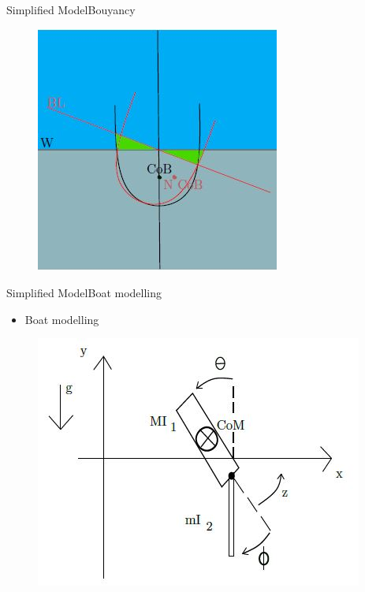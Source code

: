 \documentclass{beamer}
\begin{document}
\begin{frame}{Simplified Model}{Bouyancy \vphantom{(y}}
\vspace{-0.7em}
\begin{figure}
  \includegraphics[scale=0.7]{images/boat_b.JPG}
\end{figure}

\end{frame}

\begin{frame}{Simplified Model}{Boat modelling \vphantom{(y}}
\vspace{-0.7em}
\begin{itemize}
  \item {\color{blue}Boat modelling}
\end{itemize}
\begin{figure}
  \includegraphics[scale=0.7]{images/link_model.JPG}
\end{figure}
\end{frame}
\end{document}
